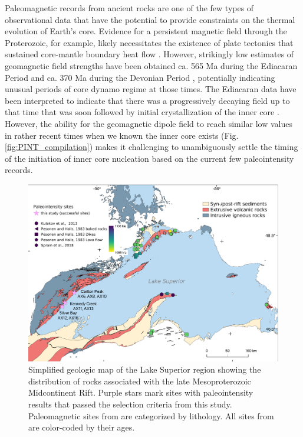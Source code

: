 \documentclass[9pt,twocolumn,twoside,lineno]{pnas-new}
\begin{document}
Paleomagnetic records from ancient rocks are one of the few types of observational data that have the potential to provide constraints on the thermal evolution of Earth’s core. Evidence for a persistent magnetic field through the Proterozoic, for example, likely necessitates the existence of plate tectonics that sustained core-mantle boundary heat flow \cite{Swanson-Hysell2021c}. However, strikingly low estimates of geomagnetic field strengths have been obtained ca. 565 Ma during the Ediacaran Period \cite{Bono2019a, Shcherbakova2019a,Thallner2021b} and ca. 370 Ma during the Devonian Period \cite{Shcherbakova2017a, Shcherbakova2021a, Hawkins2021a}, potentially indicating unusual periods of core dynamo regime at those times. The Ediacaran data have been interpreted to indicate that there was a progressively decaying field up to that time that was soon followed by initial crystallization of the inner core \cite{Bono2019a}. However, the ability for the geomagnetic dipole field to reach similar low values in rather recent times when we known the inner core exists (Fig. \ref{fig:PINT_compilation}) makes it challenging to unambiguously settle the timing of the initiation of inner core nucleation based on the current few paleointensity records.

\begin{figure}
\centering
\noindent\includegraphics[width=11.4 cm]{Geologic_map.pdf}
\caption{\footnotesize{Simplified geologic map of the Lake Superior region showing the distribution of rocks associated with the late Mesoproterozoic Midcontinent Rift. Purple stars mark sites with paleointensity results that passed the selection criteria from this study. Paleomagnetic sites from  \citealp{Pesonen1983a} are categorized by lithology. All sites from  \citealp{Pesonen1983a, Kulakov2013a, Sprain2018a} are color-coded by their ages.}}
\label{fig:Geologic_map}
\end{figure}
\end{document}
